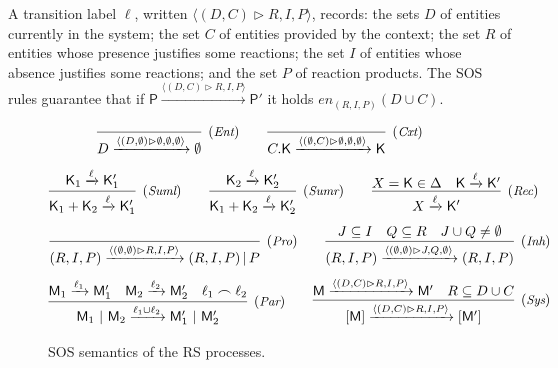 \documentclass[sn-mathphys-num,a4paper,iicol,lineno,pdflatex]{sn-jnl-hacked}
\newcommand{\obs}[2]{\langle #1\vartriangleright #2\rangle}
\theoremstyle{thmstyleone}%
\theoremstyle{thmstyletwo}%
\theoremstyle{thmstylethree}%
\begin{document}
A transition label $\ell$, written $\obs{(D,C)}{R,I,P}$, records:
the sets $D$ of entities currently in the system; 
the set $C$ of entities provided by the context;
the set $R$ of entities whose presence justifies some reactions;
the set $I$ of entities whose absence justifies some reactions;
and the set $P$ of reaction products.
The SOS rules guarantee that if $\mathsf{P}\xrightarrow{\obs{(D,C)}{R,I,P}} \mathsf{P}'$ it holds $\mathit{en}_{(R,I,P)}(D\cup C)$.
%
\begin{figure}[t]
	{\footnotesize
		$$  
		\infer[(\textit{\scriptsize{Ent}})]
		{D \xrightarrow{\obs{(D,\emptyset)}{\emptyset,\emptyset,\emptyset}}\emptyset}
		{}
		\qquad
		\infer[(\textit{\scriptsize{Cxt}})]
		{C.\mathsf{K} \xrightarrow{\obs{(\emptyset,C)}{\emptyset,\emptyset,\emptyset}}\mathsf{K}}{}
		$$
		$$
		\infer[(\textit{\scriptsize Suml})]
		{\mathsf{K}_1 + \mathsf{K}_2 \xrightarrow{\ell}\mathsf{K}'_1}
		{\mathsf{K}_1 \xrightarrow{\ell}\mathsf{K}'_1}
		\qquad
		\infer[(\textit{\scriptsize Sumr})]
		{\mathsf{K}_1 + \mathsf{K}_2 \xrightarrow{\ell}\mathsf{K}'_2}
		{\mathsf{K}_2 \xrightarrow{\ell}\mathsf{K}'_2}
		\qquad
		\infer[(\textit{\scriptsize Rec})]
		{X \xrightarrow{\ell}\mathsf{K}'}
		{X=\mathsf{K}\in\Delta & \mathsf{K} \xrightarrow{\ell}\mathsf{K}'}
		$$
		$$
		\infer[(\textit{\scriptsize Pro})]
		{(R,I,P)  \xrightarrow{\obs{(\emptyset,\emptyset)}{R,I,P}}(R,I,P)\,|\,P}
		{}
		\qquad
		\infer[(\textit{\scriptsize Inh})]
		{(R,I,P)  \xrightarrow{\obs{(\emptyset,\emptyset)}{J,Q,\emptyset}}(R,I,P)}
		{J \subseteq I & Q \subseteq R & J\cup Q\neq \emptyset}
		$$
		$$
		\infer[(\textit{\scriptsize Par})]
		{\mathsf{M}_1~|~\mathsf{M}_2\xrightarrow{\ell_1\cup\ell_2} \mathsf{M}'_1~|~\mathsf{M}'_2}
		{\mathsf{M}_1 \xrightarrow{\ell_1} \mathsf{M}'_1 &
		\mathsf{M}_2 \xrightarrow{\ell_2} \mathsf{M}'_2 &
			\ell_1\frown \ell_2 }
		\qquad
		\infer[(\textit{\scriptsize Sys})]
		{[\mathsf{M}]\xrightarrow{\obs{(D,C)}{R,I,P}} [\mathsf{M}']}
		{\mathsf{M}\xrightarrow{\obs{(D,C)}{R,I,P}} \mathsf{M}' &
			R\subseteq D\cup C}
		$$
	}
\caption{SOS semantics of the RS processes.}\label{fig:LTSforRS}
\end{figure}
\end{document}
